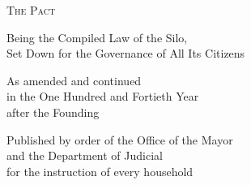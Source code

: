 \begin{titlepage}
\begin{center}
\vspace*{1.4in}

{\Huge \textsc{The Pact}}

\vspace{0.3in}
{\large Being the Compiled Law of the Silo,\\
Set Down for the Governance of All Its Citizens}

\vspace{1.6in}
{\normalsize As amended and continued\\
in the One Hundred and Fortieth Year\\
after the Founding}

\vspace{1.8in}
{\small Published by order of the Office of the Mayor\\
and the Department of Judicial\\
for the instruction of every household}

\end{center}
\end{titlepage}
